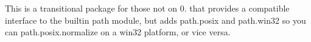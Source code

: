 This is a transitional package for those not on 0. that provides a compatible interface to the builtin {\ttfamily path} module, but adds {\ttfamily path.\+posix} and {\ttfamily path.\+win32} so you can {\ttfamily path.\+posix.\+normalize} on a win32 platform, or vice versa. 